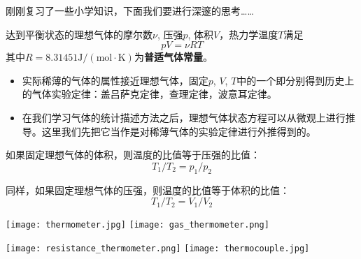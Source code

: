 \documentclass[CJK]{beamer}
\begin{document}
\begin{frame}
\bch
刚刚复习了一些小学知识，下面我们要进行深邃的思考……
\ech
\end{frame}

\begin{frame}
\bch
\ech
\end{frame}

\begin{frame}
\bch
达到平衡状态的理想气体的摩尔数$\nu$, 压强$p$, 体积$V$，热力学温度$T$满足
{\color{blue}
$$p V = \nu RT$$
}
其中$R=8.31451 \mathrm{J/(mol\cdot K)}$为{\bf 普适气体常量}。

{\scriptsize
\begin{itemize}
\item{实际稀薄的气体的属性接近理想气体，固定$p$, $V$, $T$中的一个即分别得到历史上的气体实验定律：盖吕萨克定律，查理定律，波意耳定律。}
\item{在我们学习气体的统计描述方法之后，理想气体状态方程可以从微观上进行推导。这里我们先把它当作是对稀薄气体的实验定律进行外推得到的。}
\end{itemize}
}
\ech
\end{frame}


\begin{frame}
\bch
\ech
\end{frame}


\begin{frame}
\bch
如果固定理想气体的体积，则温度的比值等于压强的比值：
$$T_1/T_2 = p_1/p_2$$

\skipline
同样，如果固定理想气体的压强，则温度的比值等于体积的比值：
$$T_1/T_2 = V_1/V_2$$


\ech
\end{frame}




\begin{frame}
\texttt{[image: thermometer.jpg]}
\hspace{0.2in}
\texttt{[image: gas\_thermometer.png]}

\texttt{[image: resistance\_thermometer.png]}
\hspace{0.2in}
\texttt{[image: thermocouple.jpg]}
\end{frame}
\end{document}
